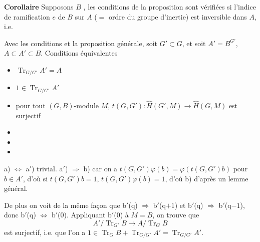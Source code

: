 \documentclass[11pt,a4paper]{article}
\begin{document}
\textbf{Corollaire} Supposons $B$ ,
 les conditions de la proposition sont vérifiées si
l'indice de ramification $e$ de $B$ sur $A$ ($=$ ordre du groupe d'inertie)
\struck{\ill{}} est inversible dans $A$, i.e. \ill{}


Avec les conditions et la proposition générale, soit $G' \subset G$, et soit
$A' = B^{G'}$, $A \subset A' \subset B$. Conditions équivalentes
\begin{itemize}
\item[a)] $\operatorname{Tr}_{G/G'} A' = A$
\item[a$'$)] $1 \in \operatorname{Tr}_{G/G'} A'$
\item[b)] pour tout $(G,B)$-module $M$, $t(G,G') : \hat{H}(G',M) \to
\hat{H}(G,M)$ est   surjectif
\item[b$'$)] \ill{}
\item[b(q))] \ill{}
\item[b$'$(q))] \ill{}
\end{itemize}

a) $\Leftrightarrow$ a$'$) trivial. a$'$) $\Rightarrow$ b) car on a
$t(G,G')\varphi(b) = \varphi(t(G,G')b)$ pour $b \in A'$, d'où si
$t(G,G')b = 1$, $t(G,G')\varphi(b) = 1$, d'où b) d'après un lemme général.


De plus on voit de la même façon que b$'$(q) $\Rightarrow$ b$'$(q$+1$) et
b$'$(q) $\Rightarrow$ b$'$(q$-1$), donc b$'$(q) $\Leftrightarrow$ b$'$(0).
Appliquant b$'$(0) à $M = B$, on trouve que
\[
A'/\operatorname{Tr}_{G'} B \longrightarrow A/\operatorname{Tr}_{G} B
\]
est surjectif, i.e. que l'on a
$1 \in \operatorname{Tr}_{G} B + \operatorname{Tr}_{G/G'} A' =
\operatorname{Tr}_{G/G'} A'$.
\end{document}
